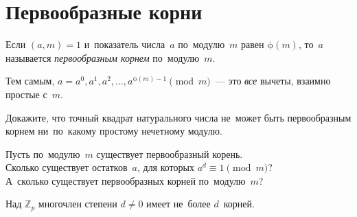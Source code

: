 
\section*{Первообразные корни}


Если $(a, m) = 1$ и~показатель числа~$a$ по~модулю~$m$ равен
$\mathrm{\phi}(m)$, то~$a$ называется \emph{первообразным корнем}
по~модулю~$m$.

Тем самым, $a = a^0, a^1, a^2, \ldots, a^{\mathrm{\phi}(m) - 1} \pmod{m}$~—
это \emph{все} вычеты, взаимно простые с~$m$.

Докажите, что точный квадрат натурального числа не~может быть первообразным
корнем ни~по~какому простому нечетному модулю.

\begin{problems}

\item
Пусть по~модулю~$m$ существует первообразный корень.
\\
\subproblem
Сколько существует остатков~$a$, для которых $a^d \equiv 1 \pmod m$?
\\
\subproblem
А~сколько существует первообразных корней по~модулю~$m$?

\end{problems}

Над $\mathbb{Z}_p$ многочлен степени $d \neq 0$ имеет не~более $d$~корней.

